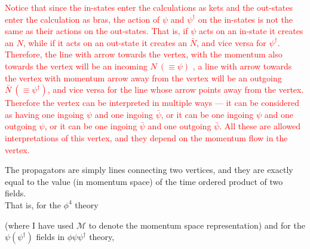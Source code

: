 \documentclass[11pt]{article}
\numberwithin{equation}{section}
\begin{document}
    \textcolor{red}{
        Notice that since the in-states enter the calculations as kets and the out-states enter the calculation as bras, the action of \(\psi\) and \(\psi^\dagger\) on the in-states is not the same as their actions on the out-states. That is, if \(\psi\) acts on an in-state it creates an \(N\), while if it acts on an out-state it creates an \(\bar N\), and vice versa for \(\psi^\dagger\). Therefore, the line with arrow towards the vertex, with the momentum also towards the vertex will be an incoming \(N~(\equiv \psi)\) , a line with arrow towards the vertex with momentum arrow away from the vertex will be an outgoing \(\bar N ~(\equiv \psi^\dagger)\), and vice versa for the line whose arrow points away from the vertex.\vspace{7pt}\\
        Therefore the vertex can be interpreted in multiple ways — it can be considered as having one ingoing \(\psi\) and one ingoing \(\bar{\psi}\), or it can be one ingoing \(\psi\) and one outgoing \(\psi\), or it can be one ingoing \(\bar{\psi}\) and one outgoing \(\bar{\psi}\). All these are allowed interpretations of this vertex, and they depend on the momentum flow in the vertex.\\
    }

    The propagators are simply lines connecting two vertices, and they are exactly equal to the value (in momentum space) of the time ordered product of two fields. \\
    That is, for the \(\phi^4\) theory 

    \begin{figure}[h]
        \centering
    \end{figure}

    (where I have used \(\mathcal{M}\) to denote the momentum space representation) and for the \(\psi(\psi^\dagger)\) fields in \(\phi\psi\psi^\dagger\) theory, 
    \begin{figure}[h]
        \centering
    \end{figure}
\end{document}
